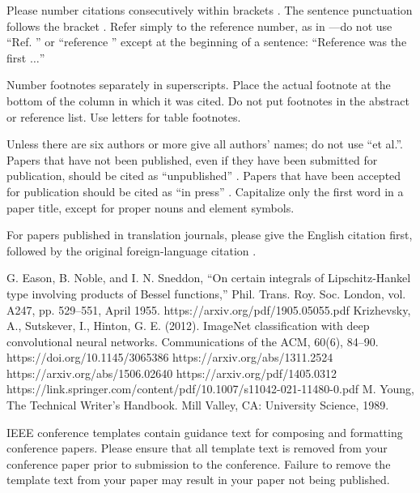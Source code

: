 \documentclass[conference]{IEEEtran}
\begin{document}
Please number citations consecutively within brackets \cite{b1}. The 
sentence punctuation follows the bracket \cite{b2}. Refer simply to the reference 
number, as in \cite{b3}---do not use ``Ref. \cite{b3}'' or ``reference \cite{b3}'' except at 
the beginning of a sentence: ``Reference \cite{b3} was the first $\ldots$''

Number footnotes separately in superscripts. Place the actual footnote at 
the bottom of the column in which it was cited. Do not put footnotes in the 
abstract or reference list. Use letters for table footnotes.

Unless there are six authors or more give all authors' names; do not use 
``et al.''. Papers that have not been published, even if they have been 
submitted for publication, should be cited as ``unpublished'' \cite{b4}. Papers 
that have been accepted for publication should be cited as ``in press'' \cite{b5}. 
Capitalize only the first word in a paper title, except for proper nouns and 
element symbols.

For papers published in translation journals, please give the English 
citation first, followed by the original foreign-language citation \cite{b6}.

\begin{thebibliography}{00}
 G. Eason, B. Noble, and I. N. Sneddon, ``On certain integrals of Lipschitz-Hankel type involving products of Bessel functions,'' Phil. Trans. Roy. Soc. London, vol. A247, pp. 529--551, April 1955.
 https://arxiv.org/pdf/1905.05055.pdf
 Krizhevsky, A., Sutskever, I., Hinton, G. E. (2012). ImageNet classification with deep convolutional neural networks. Communications of the ACM, 60(6), 84–90. https://doi.org/10.1145/3065386
  https://arxiv.org/abs/1311.2524
 https://arxiv.org/abs/1506.02640
 https://arxiv.org/pdf/1405.0312
 https://link.springer.com/content/pdf/10.1007/s11042-021-11480-0.pdf
 M. Young, The Technical Writer's Handbook. Mill Valley, CA: University Science, 1989.
\end{thebibliography}
\vspace{12pt}
\color{red}
IEEE conference templates contain guidance text for composing and formatting conference papers. Please ensure that all template text is removed from your conference paper prior to submission to the conference. Failure to remove the template text from your paper may result in your paper not being published.
\end{document}
